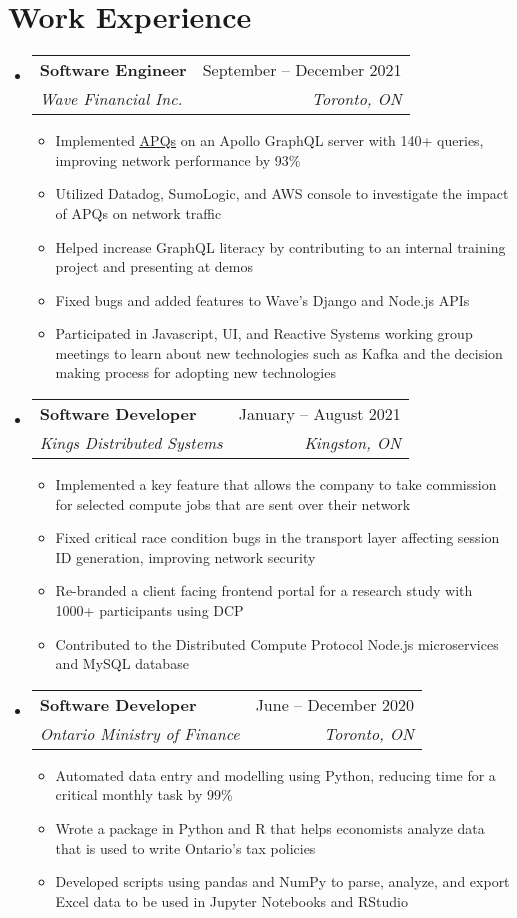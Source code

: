 \documentclass[letterpaper,11pt]{article}
\makeatletter
\newcommand{\resumeItem}[1]{
  \item\small{
    {#1 \vspace{-2pt}}
  }
}
\newcommand{\resumeSubheading}[4]{
  \vspace{-2pt}\item
    \begin{tabular*}{0.97\textwidth}[t]{l@{\extracolsep{\fill}}r}
      \textbf{#1} & #2 \\
      \textit{\small#3} & \textit{\small #4} \\
    \end{tabular*}\vspace{-7pt}
}
\newcommand{\resumeSubHeadingListStart}{\begin{itemize}[leftmargin=0.15in, label={}]}
\newcommand{\resumeSubHeadingListEnd}{\end{itemize}}
\newcommand{\resumeItemListStart}{\begin{itemize}}
\newcommand{\resumeItemListEnd}{\end{itemize}\vspace{-5pt}}
\makeatother
\begin{document}
\section{Work Experience}
  \resumeSubHeadingListStart
  
  \resumeSubheading
      {Software Engineer}{September -- December 2021}
      {Wave Financial Inc.}{Toronto, ON}
      \resumeItemListStart 
        \resumeItem{Implemented \href{https://www.apollographql.com/docs/apollo-server/performance/apq/}{\underline{APQs}} on an Apollo GraphQL server with 140+ queries, improving network performance by 93\%}
         \resumeItem{Utilized Datadog, SumoLogic, and AWS console to investigate the impact of APQs on network traffic}
         \resumeItem{Helped increase GraphQL literacy by contributing to an internal training project and presenting at demos}
         \resumeItem{Fixed bugs and added features to Wave's Django and Node.js APIs}
         \resumeItem{Participated in Javascript, UI, and Reactive Systems working group meetings to learn about new technologies such as Kafka and the decision making process for adopting new technologies}
      \resumeItemListEnd
  
  \resumeSubheading
      {Software Developer}{January -- August 2021}
      {Kings Distributed Systems}{Kingston, ON}
      \resumeItemListStart
        \resumeItem{Implemented a key feature that allows the company to take commission for selected compute jobs that are sent over their network}
        \resumeItem{Fixed critical race condition bugs in the transport layer affecting session ID generation, improving network security}
        \resumeItem{Re-branded a client facing frontend portal for a research study with 1000+ participants using DCP}
        \resumeItem{Contributed to the Distributed Compute Protocol Node.js microservices and MySQL database}
      \resumeItemListEnd

   \resumeSubheading
      {Software Developer}{June -- December 2020}
      {Ontario Ministry of Finance}{Toronto, ON}
      \resumeItemListStart
        \resumeItem{Automated data entry and modelling using Python, reducing time for a critical monthly task by 99\%}
        \resumeItem{Wrote a package in Python and R that helps economists analyze data that is used to write Ontario's tax policies}
        \resumeItem{Developed scripts using pandas and NumPy to parse, analyze, and export Excel data to be used in Jupyter Notebooks and RStudio}
      \resumeItemListEnd

  \resumeSubHeadingListEnd
  
\end{document}
